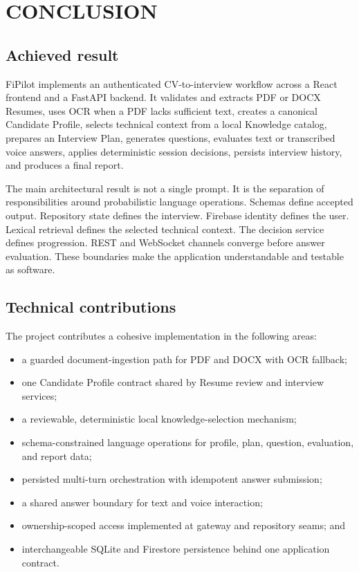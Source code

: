 \chapter{CONCLUSION}\label{ch:conclusion}

\section{Achieved result}

FiPilot implements an authenticated CV-to-interview workflow across a React frontend and a FastAPI backend. It validates and extracts PDF or DOCX Resumes, uses OCR when a PDF lacks sufficient text, creates a canonical Candidate Profile, selects technical context from a local Knowledge catalog, prepares an Interview Plan, generates questions, evaluates text or transcribed voice answers, applies deterministic session decisions, persists interview history, and produces a final report.

The main architectural result is not a single prompt. It is the separation of responsibilities around probabilistic language operations. Schemas define accepted output. Repository state defines the interview. Firebase identity defines the user. Lexical retrieval defines the selected technical context. The decision service defines progression. REST and WebSocket channels converge before answer evaluation. These boundaries make the application understandable and testable as software.

\section{Technical contributions}

The project contributes a cohesive implementation in the following areas:
\begin{itemize}
  \item a guarded document-ingestion path for PDF and DOCX with OCR fallback;
  \item one Candidate Profile contract shared by Resume review and interview services;
  \item a reviewable, deterministic local knowledge-selection mechanism;
  \item schema-constrained language operations for profile, plan, question, evaluation, and report data;
  \item persisted multi-turn orchestration with idempotent answer submission;
  \item a shared answer boundary for text and voice interaction;
  \item ownership-scoped access implemented at gateway and repository seams; and
  \item interchangeable SQLite and Firestore persistence behind one application contract.
\end{itemize}

